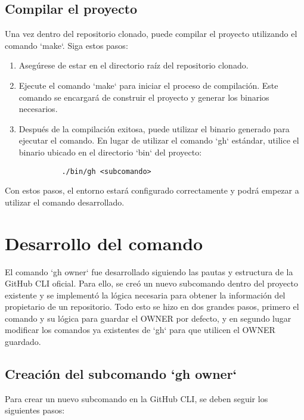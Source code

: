 \subsection{Compilar el proyecto}

Una vez dentro del repositorio clonado, puede compilar el proyecto utilizando el comando `make`. Siga estos pasos:

\begin{enumerate}
  \item Asegúrese de estar en el directorio raíz del repositorio clonado.
  \item Ejecute el comando `make` para iniciar el proceso de compilación. Este comando se encargará de construir el proyecto y generar los binarios necesarios.
  \item Después de la compilación exitosa, puede utilizar el binario generado para ejecutar el comando. En lugar de utilizar el comando `gh` estándar, utilice el binario ubicado en el directorio `bin` del proyecto:
        \begin{verbatim}
          ./bin/gh <subcomando>
        \end{verbatim}
\end{enumerate}

Con estos pasos, el entorno estará configurado correctamente y podrá empezar a utilizar el comando desarrollado.

\section{Desarrollo del comando}

El comando `gh owner` fue desarrollado siguiendo las pautas y estructura de la GitHub CLI oficial. Para ello, se creó un nuevo subcomando dentro del proyecto existente y se implementó la lógica necesaria para obtener la información del propietario de un repositorio. Todo esto se hizo en dos grandes pasos, primero el comando y su lógica para guardar el OWNER por defecto, y en segundo lugar modificar los comandos ya existentes de `gh` para que utilicen el OWNER guardado.

\subsection{Creación del subcomando `gh owner`}
Para crear un nuevo subcomando en la GitHub CLI, se deben seguir los siguientes pasos:

